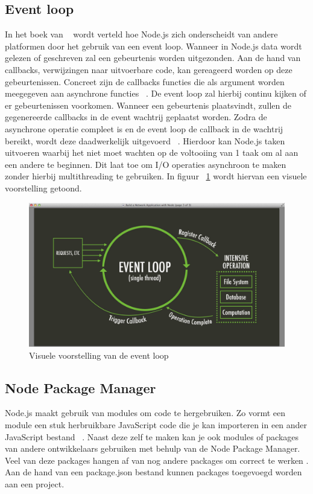 \subsection{Event loop}
In het boek van ~\textcite{Ali2013} wordt verteld hoe Node.js zich onderscheidt van andere platformen door het gebruik van een event loop.
Wanneer in Node.js data wordt gelezen of geschreven zal een gebeurtenis worden uitgezonden. 
Aan de hand van callbacks, verwijzingen naar uitvoerbare code, kan gereageerd worden op deze gebeurtenissen. 
Concreet zijn de callbacks functies die als argument worden meegegeven aan asynchrone functies ~\autocite{Kumar2023}. 
De event loop zal hierbij continu kijken of er gebeurtenissen voorkomen. Wanneer een gebeurtenis plaatsvindt, zullen de gegenereerde callbacks in de event wachtrij geplaatst worden.
Zodra de asynchrone operatie compleet is en de event loop de callback in de wachtrij bereikt, wordt deze daadwerkelijk uitgevoerd ~\autocite{Kumar2023}.
Hierdoor kan Node.js taken uitvoeren waarbij het niet moet wachten op de voltooiing van 1 taak om al aan een andere te beginnen. 
Dit laat toe om I/O operaties asynchroon te maken zonder hierbij multithreading te gebruiken.
In figuur ~\ref{fig:eventloop} wordt hiervan een visuele voorstelling getoond.
\begin{figure}[h]
    \centering
    \includegraphics[width=.9\textwidth]{graphics/eventloop.png}
    \caption{\label{fig:eventloop}Visuele voorstelling van de event loop ~\autocite{Luxembourg2023}}
\end{figure}

\subsection{Node Package Manager}
Node.js maakt gebruik van modules om code te hergebruiken. 
Zo vormt een module een stuk herbruikbare JavaScript code 
die je kan importeren in een ander JavaScript bestand ~\autocite{Semah2022}.
Naast deze zelf te maken kan je ook modules of packages van andere ontwikkelaars gebruiken met behulp van de Node Package Manager.
Veel van deze packages hangen af van nog andere packages om correct te werken \autocite{kula2017}.
Aan de hand van een package.json bestand kunnen packages toegevoegd worden aan een project.

